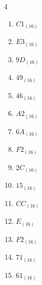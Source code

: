 \begin{multicols}{4}
\begin{enumerate}
        \phantom{$=55$}

  \item $C1_{(16)}$

        \phantom{$=193$}

  \item $E3_{(16)}$

        \phantom{$=227$}

  \item $9D_{(16)}$

        \phantom{$=157$}

  \item $49_{(16)}$

        \phantom{$=73$}

  \item $46_{(16)}$

        \phantom{$=70$}

  \item $A2_{(16)}$

        \phantom{$=162$}

  \item $6A_{(16)}$

        \phantom{$=106$}

\columnbreak %

  \item $F2_{(16)}$

        \phantom{$=242$}

  \item $2C_{(16)}$

        \phantom{$=44$}

  \item $15_{(16)}$

        \phantom{$=21$}

  \item $CC_{(16)}$

        \phantom{$=204$}

  \item $E_{(16)}$

        \phantom{$=14$}

  \item $F2_{(16)}$

        \phantom{$=242$}

  \item $71_{(16)}$

        \phantom{$=113$}

  \item $61_{(16)}$

        \phantom{$=97$}


\end{enumerate}
\end{multicols}
